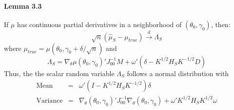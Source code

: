 \documentclass[12pt]{article}
\theoremstyle{definition}
\begin{document}
\paragraph{Lemma 3.3} If $\mu$ has continuous partial derivatives in a neighborhood of $(\theta_0, \gamma_0)$, then:
	$$
	\sqrt{n}\left( \hat{\mu}_S - \mu_{true} \right) \overset{d}{\rightarrow} \Lambda_S
$$
where $\mu_{true} = \mu(\theta_0, \gamma_0+\delta/\sqrt{n})$ and 
	$$
	\Lambda_S = \nabla_\theta \mu(\theta_0, \gamma_0)' J_{00}^{-1} M + \omega'\left( \delta - K^{1/2}H_S K^{-1/2}D\right)
$$
Thus, the the scalar random variable $\Lambda_S$ follows a normal distribution with
	\begin{eqnarray*}
		\mbox{Mean}&=&\omega'(I - K^{1/2}H_SK^{-1/2})\delta\\
		\mbox{Variance}&=&\nabla_\theta(\theta_0, \gamma_0)'J_{00}^{-1}\nabla_\theta(\theta_0, \gamma_0) + \omega'K^{1/2}H_S K^{1/2}\omega
	\end{eqnarray*}
\end{document}
